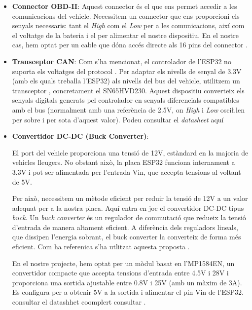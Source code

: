 \documentclass{tfgitic}[2024/07/01]
\begin{document}
\begin{itemize}
\begin{itemize}
    Ranura per a targeta , que permet la connexió a la xarxa mòbil.

    Connexió per a antena  externa, inclosa al kit essencial per a la comunicació. Es tracta d'una antena \textit{Full Band LTE} (698-960 MHz / 1710-2690 MHz), compatible amb la majoria de bandes 
    mòbils utilitzades pels operadors.

  \end{itemize} 
  \item \textbf{Connector OBD-II}: Aquest connector és el que ens permet accedir a les comunicacions del vehicle. Necessitem un connector que ens proporcioni els senyals necessaris: 
  tant el  \textit{ High} com el  \textit{Low} per a les comunicacions, així com el voltatge de la bateria i el  per alimentar el nostre dispositiu. En el nostre cas, hem optat per un cable 
  que dóna accés directe als 16 pins del connector .
  
  \item \textbf{Transceptor CAN}: Com s'ha mencionat, el controlador  de l'ESP32 no suporta els voltatges del protocol . Per adaptar els nivells de senyal de 3.3V (amb els quals 
  treballa l'ESP32) als nivells del bus  del vehicle, utilitzem un transceptor , concretament el SN65HVD230. Aquest dispositiu converteix els senyals digitals generats pel controlador 
   en senyals diferencials compatibles amb el bus  (normalment amb una referència de 2.5V, on  \textit{High} i  \textit{Low} osci\l.len per sobre i per sota d'aquest valor). Podeu consultar el 
  \textit{datasheet} aquí \cite{ti_sn65hvd230}
  
  \item \textbf{Convertidor DC-DC (Buck Converter)}:

  El port  del vehicle proporciona una tensió de 12V, estàndard en la majoria de vehicles lleugers. No obstant això, la placa ESP32 funciona internament a 3.3V i pot ser alimentada 
  per l'entrada Vin, que accepta tensions al voltant de 5V.

  Per això, necessitem un mètode eficient per reduir la tensió de 12V a un valor adequat per a la nostra placa. Aquí entra en joc el convertidor DC-DC tipus \textit{buck}. Un \textit{buck converter} és 
  un regulador de commutació que redueix la tensió d'entrada de manera altament eficient. A diferència dels reguladors lineals, que dissipen l'energia 
  sobrant, el buck converter la converteix de forma més eficient. Com ha referenica s'ha utlitzat aquesta proposta \cite{espboards_power}.

  En el nostre projecte, hem optat per un mòdul basat en l'MP1584EN, un convertidor compacte que accepta tensions d'entrada entre 4.5V i 28V i proporciona una sortida ajustable entre 0.8V i 
  25V (amb un màxim de 3A). Es configura per a obtenir 5V a la sortida i alimentar el pin Vin de l'ESP32. consultar el datashhet coomplert consultar \cite{all_datasheet_mp1584en}.
\end{itemize} 
\end{document}
